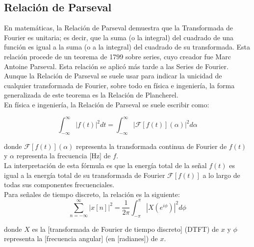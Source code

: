 \documentclass{article}
\begin{document}
\subsection{Relación de Parseval}

En matemáticas, la Relación de Parseval demuestra que la Transformada de Fourier es unitaria; es decir, que la suma (o la integral) del cuadrado de una función es igual a la suma (o a la integral) del cuadrado de su transformada. Esta relación procede de un teorema de 1799 sobre series, cuyo creador fue Marc Antoine Parseval. Esta relación se aplicó más tarde a las Series de Fourier.\citep{RelacionParseval}\\

Aunque la Relación de Parseval se suele usar para indicar la unicidad de cualquier transformada de Fourier, sobre todo en física e ingeniería, la forma generalizada de este teorema es la Relación de Plancherel.\citep{RelacionParseval}\\

En física e ingeniería, la Relación de Parseval se suele escribir como:\citep{RelacionParseval}

    \begin{equation}
        \int_{-\infty}^{\infty} | f(t) |^2 dt   = \int_{-\infty}^{\infty} | \mathcal{F} [ f(t) ] (\alpha ) |^2 d\alpha 
    \end{equation}
    
    
donde $\mathcal{F} [ f(t) ] (\alpha )$ representa la transformada continua de Fourier de $f(t)$ y $\alpha$ representa la frecuencia [Hz] de $f$.\citep{RelacionParseval}\\

La interpretación de esta fórmula es que la energía total de la señal $f(t)$ es igual a la energía total de su transformada de Fourier $\mathcal{F} [ f(t)]$ a lo largo de todas sus componentes frecuenciales.\citep{RelacionParseval}\\

Para señales de tiempo discreto, la relación es la siguiente:\citep{RelacionParseval}\\

\begin{equation}
    \sum_{n=-\infty}^{\infty} | x[n] |^2  =  \frac{1}{2\pi} \int_{-\pi}^{\pi} | X(e^{i\phi}) |^2 d\phi 
\end{equation}


donde $X$ es la [transformada de Fourier de tiempo discreto] (DTFT) de $x$ y $\phi$ representa la [frecuencia angular] (en [radianes]) de $x$.\citep{RelacionParseval}\\
\end{document}
